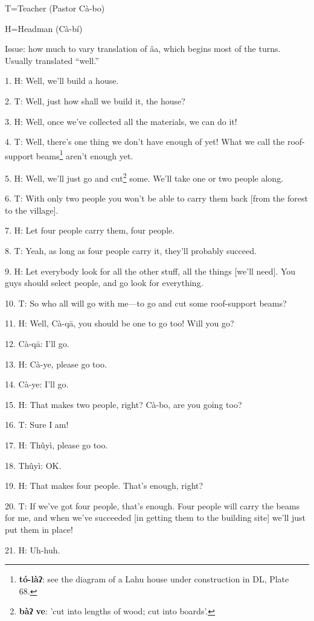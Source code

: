\setcounter{footnote}{0}

T=Teacher (Pastor Cà-bo)

H=Headman (Cà-bí)

Issue: how much to vary translation of âa, which begins most of the turns. Usually
translated ``well.''

1. H: Well, we'll build a house.

2. T: Well, just how shall we build it, the house?

3. H: Well, once we've collected all the materials, we can do it!

4. T: Well, there's one thing we don't have enough of yet! What we call the roof-support
beams\footnote{\textbf{tó-làʔ}: see the diagram of a Lahu house under construction in DL, Plate 68.} aren't enough yet.

5. H: Well, we'll just go and cut\footnote{\textbf{bàʔ} \textbf{ve}: 'cut into lengths of wood; cut into boards'.} some. We'll take one or two people along.

6. T: With only two people you won't be able to carry them back [from the forest
to the village].

7. H: Let four people carry them, four people.

8. T: Yeah, as long as four people carry it, they'll probably succeed.

9. H: Let everybody look for all the other stuff, all the things [we'll need].
You guys should select people, and go look for everything.

10. T: So who all will go with me---to go and cut some roof-support beams?

11. H: Well, Cà-qā, you should be one to go too! Will you go?

12. Cà-qā: I'll go.

13. H: Cà-ye, please go too.

14. Cà-ye: I'll go.

15. H: That makes two people, right? Cà-bo, are you going too?

16. T: Sure I am!

17. H: Thûyì, please go too.

18. Thûyì: OK.

19. H: That makes four people. That's enough, right?

20. T: If we've got four people, that's enough. Four people will carry the beams
for me, and when we've succeeded [in getting them to the building site] we'll just
put them in place!

21. H: Uh-huh.

